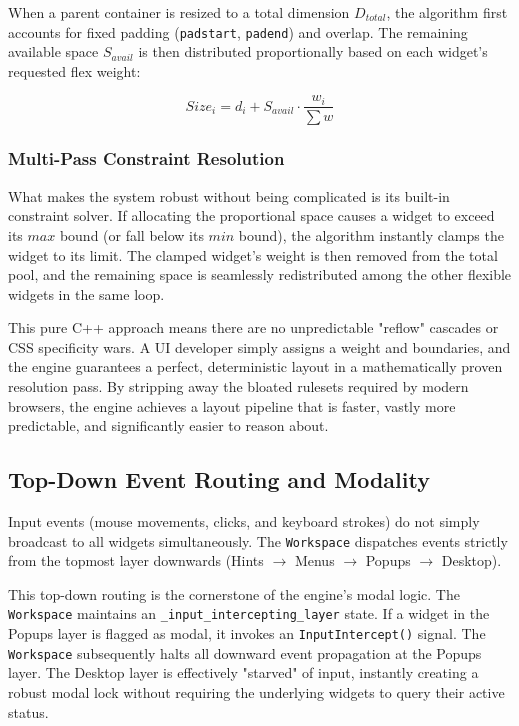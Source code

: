 \documentclass[11pt, a4paper]{article}
\begin{document}
When a parent container is resized to a total dimension $D_{total}$, the algorithm first accounts for fixed padding (\texttt{padstart}, \texttt{padend}) and overlap. The remaining available space $S_{avail}$ is then distributed proportionally based on each widget's requested flex weight:

\begin{equation}
Size_{i} = d_{i} + S_{avail} \cdot \frac{w_{i}}{\sum w}
\end{equation}

\subsubsection{Multi-Pass Constraint Resolution}
What makes the system robust without being complicated is its built-in constraint solver. If allocating the proportional space causes a widget to exceed its $max$ bound (or fall below its $min$ bound), the algorithm instantly clamps the widget to its limit. The clamped widget's weight is then removed from the total pool, and the remaining space is seamlessly redistributed among the other flexible widgets in the same loop.

This pure C++ approach means there are no unpredictable "reflow" cascades or CSS specificity wars. A UI developer simply assigns a weight and boundaries, and the engine guarantees a perfect, deterministic layout in a mathematically proven resolution pass. By stripping away the bloated rulesets required by modern browsers, the engine achieves a layout pipeline that is faster, vastly more predictable, and significantly easier to reason about.

\subsection{Top-Down Event Routing and Modality}
Input events (mouse movements, clicks, and keyboard strokes) do not simply broadcast to all widgets simultaneously. The \texttt{Workspace} dispatches events strictly from the topmost layer downwards (Hints $\rightarrow$ Menus $\rightarrow$ Popups $\rightarrow$ Desktop). 

This top-down routing is the cornerstone of the engine's modal logic. The \texttt{Workspace} maintains an \texttt{\_input\_intercepting\_layer} state. If a widget in the Popups layer is flagged as modal, it invokes an \texttt{InputIntercept()} signal. The \texttt{Workspace} subsequently halts all downward event propagation at the Popups layer. The Desktop layer is effectively "starved" of input, instantly creating a robust modal lock without requiring the underlying widgets to query their active status.
\end{document}
